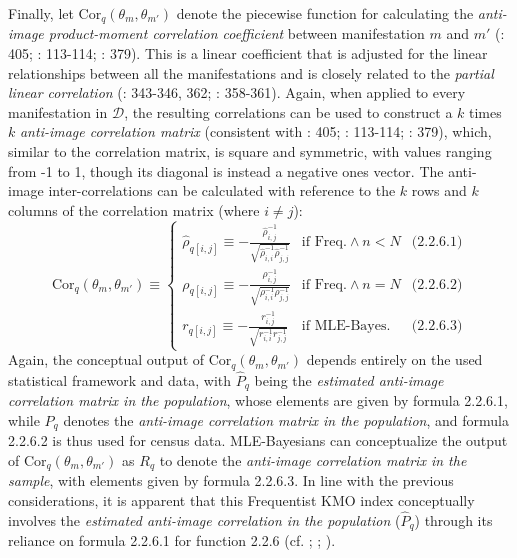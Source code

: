 \documentclass[
  10pt,
  a4paper,
  twoside]{article}
\begin{document}
Finally, let \(\text{Cor}_q(\theta_m, \theta_{m'})\) denote the piecewise function for calculating the \emph{anti-image product-moment correlation coefficient} between manifestation \(m\) and \(m'\) (: 405; : 113-114; : 379). This is a linear coefficient that is adjusted for the linear relationships between all the manifestations and is closely related to the \emph{partial linear correlation} (: 343-346, 362; : 358-361). Again, when applied to every manifestation in \(\mathcal{D}\), the resulting correlations can be used to construct a \(k\) times \(k\) \emph{anti-image correlation matrix} (consistent with : 405; : 113-114; : 379), which, similar to the correlation matrix, is square and symmetric, with values ranging from -1 to 1, though its diagonal is instead a negative ones vector. The anti-image inter-correlations can be calculated with reference to the \(k\) rows and \(k\) columns of the correlation matrix (where \(i \neq j\)):
\[
\text{Cor}_q(\theta_m, \theta_{m'}) \equiv
\left\{
\begin{array}{lll}
  \hat{\rho}_{q[i,j]} \equiv -\frac{\hat{\rho}_{i,j}^{-1}}{\sqrt{\hat{\rho}_{i,i}^{-1}\hat{\rho}_{j,j}^{-1}}} & \text{if Freq.} \land n < N & \text{(2.2.6.1)} \\
  \rho_{q[i,j]} \equiv -\frac{\rho_{i,j}^{-1}}{\sqrt{\rho_{i,i}^{-1}\rho_{j,j}^{-1}}} & \text{if Freq.} \land n = N & \text{(2.2.6.2)} \\
  \textit{r}_{q[i,j]} \equiv -\frac{\textit{r}_{i,j}^{-1}}{\sqrt{\textit{r}_{i,i}^{-1}\textit{r}_{j,j}^{-1}}} & \text{if MLE-Bayes.} & \text{(2.2.6.3)}
\end{array}
\right.
\tag{2.2.6}
\]
Again, the conceptual output of \(\text{Cor}_q(\theta_m, \theta_{m'})\) depends entirely on the used statistical framework and data, with \(\hat{P}_q\) being the \emph{estimated anti-image correlation matrix in the population}, whose elements are given by formula 2.2.6.1, while \(P_q\) denotes the \emph{anti-image correlation matrix in the population}, and formula 2.2.6.2 is thus used for census data. MLE-Bayesians can conceptualize the output of \(\text{Cor}_q(\theta_m, \theta_{m'})\) as \(\textit{R}_q\) to denote the \emph{anti-image correlation matrix in the sample}, with elements given by formula 2.2.6.3. In line with the previous considerations, it is apparent that this Frequentist KMO index conceptually involves the \emph{estimated anti-image correlation in the population} (\(\hat{P}_q\)) through its reliance on formula 2.2.6.1 for function 2.2.6 (cf. ; ; ).
\end{document}
